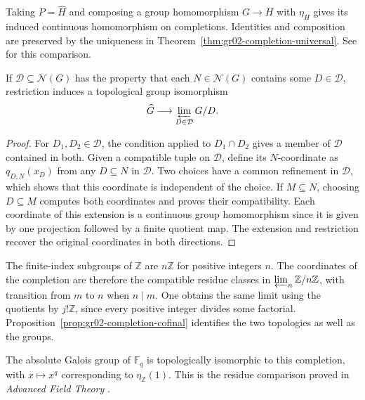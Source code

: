 Taking \(P=\widehat H\) and composing a group homomorphism
\(G\to H\) with \(\eta_H\) gives its induced continuous homomorphism
on completions. Identities and composition are preserved by
the uniqueness in Theorem~\ref{thm:gr02-completion-universal}.
See \cite[Proposition 3.1.2]{profinite-source} for this comparison.

\begin{proposition}
\label{prop:gr02-completion-cofinal}
If \(\mathcal D\subseteq\mathcal N(G)\) has the property that each
\(N\in\mathcal N(G)\) contains some \(D\in\mathcal D\), restriction
induces a topological group isomorphism
\[
       \widehat G \longrightarrow
       \varprojlim_{D\in\mathcal D}G/D .
\]
\end{proposition}

\begin{proof}
For \(D_1,D_2\in\mathcal D\), the condition applied to
\(D_1\cap D_2\) gives a member of \(\mathcal D\) contained in both.
Given a compatible tuple on \(\mathcal D\), define its \(N\)-coordinate
as \(q_{D,N}(x_D)\) from any \(D\subseteq N\) in \(\mathcal D\).
Two choices have a common refinement in \(\mathcal D\), which
shows that this coordinate is independent of the choice.
If \(M\subseteq N\), choosing \(D\subseteq M\) computes both
coordinates and proves their compatibility. Each coordinate of
this extension is a continuous group homomorphism since it is
given by one projection followed by a finite quotient map.
The extension and restriction recover the original coordinates
in both directions.
\end{proof}

\begin{example}
\label{ex:gr02-completion-integers}
The finite-index subgroups of \(\mathbb Z\) are \(n\mathbb Z\) for
positive integers \(n\). The coordinates of the completion are
therefore the compatible residue classes in
\(\varprojlim_n\mathbb Z/n\mathbb Z\), with transition from \(m\)
to \(n\) when \(n\mid m\). One obtains the same limit using
the quotients by \(j!\mathbb Z\), since every positive integer
divides some factorial. Proposition~\ref{prop:gr02-completion-cofinal}
identifies the two topologies as well as the groups.

The absolute Galois group of \(\mathbb F_q\) is topologically
isomorphic to this completion, with \(x\mapsto x^q\) corresponding
to \(\eta_{\mathbb Z}(1)\). This is the residue comparison proved
in \emph{Advanced Field Theory} \cite[Result E06]{field}.
\end{example}

